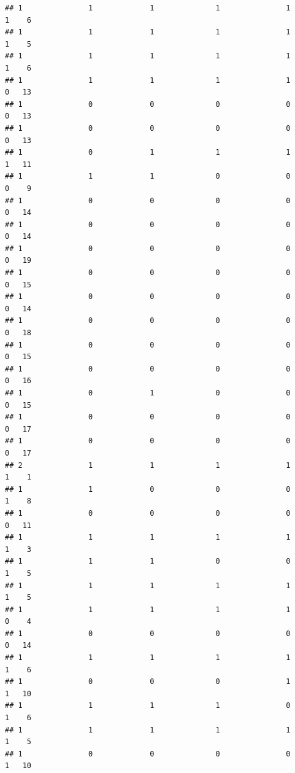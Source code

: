 \documentclass[
]{article}
\begin{document}
\begin{verbatim}
## 1               1             1              1               1           1    6
## 1               1             1              1               1           1    5
## 1               1             1              1               1           1    6
## 1               1             1              1               1           0   13
## 1               0             0              0               0           0   13
## 1               0             0              0               0           0   13
## 1               0             1              1               1           1   11
## 1               1             1              0               0           0    9
## 1               0             0              0               0           0   14
## 1               0             0              0               0           0   14
## 1               0             0              0               0           0   19
## 1               0             0              0               0           0   15
## 1               0             0              0               0           0   14
## 1               0             0              0               0           0   18
## 1               0             0              0               0           0   15
## 1               0             0              0               0           0   16
## 1               0             1              0               0           0   15
## 1               0             0              0               0           0   17
## 1               0             0              0               0           0   17
## 2               1             1              1               1           1    1
## 1               1             0              0               0           1    8
## 1               0             0              0               0           0   11
## 1               1             1              1               1           1    3
## 1               1             1              0               0           1    5
## 1               1             1              1               1           1    5
## 1               1             1              1               1           0    4
## 1               0             0              0               0           0   14
## 1               1             1              1               1           1    6
## 1               0             0              0               1           1   10
## 1               1             1              1               0           1    6
## 1               1             1              1               1           1    5
## 1               0             0              0               0           1   10

\end{verbatim}
\end{document}
